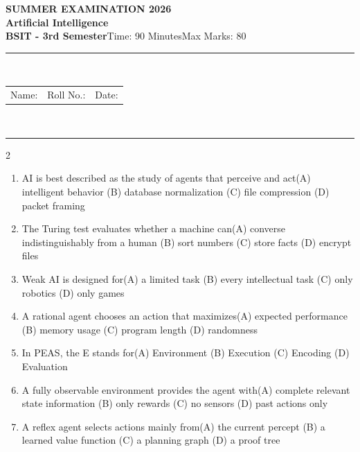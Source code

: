 \documentclass[a4paper]{article}
\makeatletter
\newcommand{\examheader}{%
\begin{center}\textbf{\large SUMMER EXAMINATION 2026}\\[-1pt]
\textbf{\normalsize Artificial Intelligence}\\[-1pt]
\textbf{BSIT - 3rd Semester}\quad Time: 90 Minutes\quad Max Marks: 80\\[-1pt]
\textcolor{black!65}{\rule{\linewidth}{0.45pt}}\\[-2pt]
\begin{tabularx}{\linewidth}{@{}X X X@{}}Name: \hrulefill & Roll No.: \hrulefill & Date: \hrulefill\end{tabularx}\\[-1pt]
\textcolor{black!65}{\rule{\linewidth}{0.45pt}}\end{center}}
\makeatother
\begin{document}
\examheader
\raggedcolumns
\begin{multicols*}{2}
\fontsize{8.5}{10}\selectfont
\begin{enumerate}
\item AI is best described as the study of agents that perceive and act\newline\hspace*{0.6em}(A) intelligent behavior \quad (B) database normalization \newline\hspace*{0.6em}(C) file compression \quad (D) packet framing
\item The Turing test evaluates whether a machine can\newline\hspace*{0.6em}(A) converse indistinguishably from a human \quad (B) sort numbers \newline\hspace*{0.6em}(C) store facts \quad (D) encrypt files
\item Weak AI is designed for\newline\hspace*{0.6em}(A) a limited task \quad (B) every intellectual task \newline\hspace*{0.6em}(C) only robotics \quad (D) only games
\item A rational agent chooses an action that maximizes\newline\hspace*{0.6em}(A) expected performance \quad (B) memory usage \newline\hspace*{0.6em}(C) program length \quad (D) randomness
\item In PEAS, the E stands for\newline\hspace*{0.6em}(A) Environment \quad (B) Execution \newline\hspace*{0.6em}(C) Encoding \quad (D) Evaluation
\item A fully observable environment provides the agent with\newline\hspace*{0.6em}(A) complete relevant state information \quad (B) only rewards \newline\hspace*{0.6em}(C) no sensors \quad (D) past actions only
\item A reflex agent selects actions mainly from\newline\hspace*{0.6em}(A) the current percept \quad (B) a learned value function \newline\hspace*{0.6em}(C) a planning graph \quad (D) a proof tree

\end{enumerate}
\end{multicols*}
\end{document}

